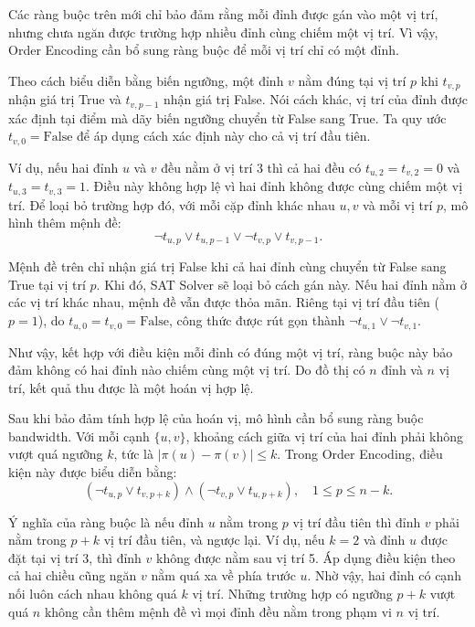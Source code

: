 \documentclass[a4paper,fleqn]{cas-sc}
\begin{document}
Các ràng buộc trên mới chỉ bảo đảm rằng mỗi đỉnh được gán vào một vị trí, nhưng chưa ngăn được trường hợp nhiều đỉnh cùng chiếm một vị trí. Vì vậy, Order Encoding cần bổ sung ràng buộc để mỗi vị trí chỉ có một đỉnh.

Theo cách biểu diễn bằng biến ngưỡng, một đỉnh $v$ nằm đúng tại vị trí $p$ khi $t_{v,p}$ nhận giá trị True và $t_{v,p-1}$ nhận giá trị False. Nói cách khác, vị trí của đỉnh được xác định tại điểm mà dãy biến ngưỡng chuyển từ False sang True. Ta quy ước $t_{v,0}=\mathrm{False}$ để áp dụng cách xác định này cho cả vị trí đầu tiên.

Ví dụ, nếu hai đỉnh $u$ và $v$ đều nằm ở vị trí 3 thì cả hai đều có $t_{u,2}=t_{v,2}=0$ và $t_{u,3}=t_{v,3}=1$. Điều này không hợp lệ vì hai đỉnh không được cùng chiếm một vị trí. Để loại bỏ trường hợp đó, với mỗi cặp đỉnh khác nhau $u,v$ và mỗi vị trí $p$, mô hình thêm mệnh đề:
\begin{equation}
\neg t_{u,p}\lor t_{u,p-1}\lor\neg t_{v,p}\lor t_{v,p-1}.
\label{eq:order-injective}
\end{equation}

Mệnh đề trên chỉ nhận giá trị False khi cả hai đỉnh cùng chuyển từ False sang True tại vị trí $p$. Khi đó, SAT Solver sẽ loại bỏ cách gán này. Nếu hai đỉnh nằm ở các vị trí khác nhau, mệnh đề vẫn được thỏa mãn. Riêng tại vị trí đầu tiên ($p=1$), do $t_{u,0}=t_{v,0}=\mathrm{False}$, công thức được rút gọn thành $\neg t_{u,1}\lor\neg t_{v,1}$.

Như vậy, kết hợp với điều kiện mỗi đỉnh có đúng một vị trí, ràng buộc này bảo đảm không có hai đỉnh nào chiếm cùng một vị trí. Do đồ thị có $n$ đỉnh và $n$ vị trí, kết quả thu được là một hoán vị hợp lệ.

Sau khi bảo đảm tính hợp lệ của hoán vị, mô hình cần bổ sung ràng buộc bandwidth. Với mỗi cạnh $\{u,v\}$, khoảng cách giữa vị trí của hai đỉnh phải không vượt quá ngưỡng $k$, tức là $|\pi(u)-\pi(v)|\leq k$. Trong Order Encoding, điều kiện này được biểu diễn bằng:
\begin{equation}
(\neg t_{u,p}\lor t_{v,p+k})\land
(\neg t_{v,p}\lor t_{u,p+k}),
\quad 1\leq p\leq n-k.
\label{eq:order-edge}
\end{equation}

Ý nghĩa của ràng buộc là nếu đỉnh $u$ nằm trong $p$ vị trí đầu tiên thì đỉnh $v$ phải nằm trong $p+k$ vị trí đầu tiên, và ngược lại. Ví dụ, nếu $k=2$ và đỉnh $u$ được đặt tại vị trí 3, thì đỉnh $v$ không được nằm sau vị trí 5. Áp dụng điều kiện theo cả hai chiều cũng ngăn $v$ nằm quá xa về phía trước $u$. Nhờ vậy, hai đỉnh có cạnh nối luôn cách nhau không quá $k$ vị trí. Những trường hợp có ngưỡng $p+k$ vượt quá $n$ không cần thêm mệnh đề vì mọi đỉnh đều nằm trong phạm vi $n$ vị trí.
\end{document}
